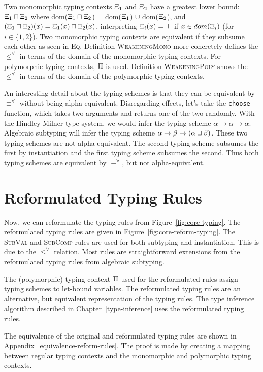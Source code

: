 Two monomorphic typing contexts $\Xi_1$ and $\Xi_2$ have a greatest lower bound: $\Xi_1 \sqcap \Xi_2$ where dom($\Xi_1 \sqcap \Xi_2$) = dom($\Xi_1$) $\cup$ dom($\Xi_2$), and $(\Xi_1 \sqcap \Xi_2)(x) = \Xi_1(x) \sqcap \Xi_2(x)$, interpreting $\Xi_i(x) = \top$ if $x \in dom(\Xi_i)$ (for $i \in \{1, 2\}$). \cite{dolan2017algebraic} Two monomorphic typing contexts are equivalent if they subsume each other as seen in \textsc{Eq}. Definition \textsc{WeakeningMono} more concretely defines the $\le^\forall$ in terms of the domain of the monomorphic typing contexts. For polymorphic typing contexts, $\Pi$ is used. Definition \textsc{WeakeningPoly} shows the $\le^\forall$ in terms of the domain of the polymorphic typing contexts.

An interesting detail about the typing schemes is that they can be equivalent by $\equiv^\forall$ without being alpha-equivalent. Disregarding effects, let's take the \texttt{choose} function, which takes two arguments and returns one of the two randomly. With the Hindley-Milner type system, we would infer the typing scheme $\alpha \to \alpha \to \alpha$. Algebraic subtyping will infer the typing scheme $\alpha \to \beta \to (\alpha \sqcup \beta)$. These two typing schemes are not alpha-equivalent. The second typing scheme subsumes the first by instantiation and the first typing scheme subsumes the second. Thus both typing schemes are equivalent by $\equiv^\forall$, but not alpha-equivalent. 

\section{Reformulated Typing Rules}\label{reformulated}
Now, we can reformulate the typing rules from Figure~\ref{fig:core-typing}. The reformulated typing rules are given in Figure~\ref{fig:core-reform-typing}. The \textsc{SubVal} and \textsc{SubComp} rules are used for both subtyping and instantiation. This is due to the $\le^\forall$ relation. Most rules are straightforward extensions from the reformulated typing rules from algebraic subtyping. 

The (polymorphic) typing context $\Pi$ used for the reformulated rules assign typing schemes to let-bound variables. The reformulated typing rules are an alternative, but equivalent representation of the typing rules. The type inference algorithm described in Chapter~\ref{type-inference} uses the reformulated typing rules. 

The equivalence of the original and reformulated typing rules are shown in Appendix~\ref{equivalence-reform-rules}. The proof is made by creating a mapping between regular typing contexts and the monomorphic and polymorphic typing contexts. 

